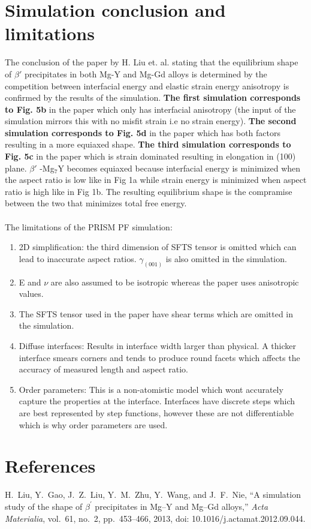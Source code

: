 \documentclass[11pt]{article}
\newcommand{\bprime} {$\beta'$ }
\begin{document}
\section*{Simulation conclusion and limitations}
The conclusion of the paper by H. Liu et. al. stating that the 
equilibrium shape of \bprime precipitates in both Mg-Y and Mg-Gd 
alloys is determined by the competition between interfacial energy 
and elastic strain energy anisotropy is confirmed by the results of the simulation. 
\textbf{The first simulation corresponds to Fig. 5b} in the paper which only has interfacial anisotropy (the input of the simulation mirrors this with no misfit strain i.e no strain energy).
\textbf{The second simulation corresponds to Fig. 5d} in the paper which has both factors resulting in a more equiaxed shape.
\textbf{The third simulation corresponds to Fig. 5c} in the paper which is strain dominated resulting in elongation in (100) plane.
\bprime-Mg$_7$Y becomes equiaxed because interfacial energy is minimized when the aspect ratio is low like in Fig 1a while strain energy is minimized when aspect ratio is high like in Fig 1b.
The resulting equilibrium shape is the compramise between the two that minimizes total free energy.
\\~\\
The limitations of the PRISM PF simulation:
\begin{enumerate}
    \item 2D simplification: the third dimension of SFTS tensor is omitted which can lead to inaccurate aspect ratios. $\gamma_{(001)}$ is also omitted in the simulation.
    \item E and $\nu$ are also assumed to be isotropic whereas the paper uses anisotropic values.
    \item The SFTS tensor used in the paper have shear terms which are omitted in the simulation.
    \item Diffuse interfaces: Results in interface width larger than physical. A thicker interface smears corners and tends to produce round facets
    which affects the accuracy of measured length and aspect ratio.
    \item Order parameters: This is a non-atomistic model which wont accurately capture the properties at the interface. Interfaces have discrete steps which are best represented by step functions, however these are not differentiable which is why order parameters are used.
\end{enumerate}
\newpage
\section*{References}
\noindent [1] H.~Liu, Y.~Gao, J.~Z.~Liu, Y.~M.~Zhu, Y.~Wang, and J.~F.~Nie,
``A simulation study of the shape of $\beta^\prime$ precipitates in Mg--Y and
Mg--Gd alloys,'' \emph{Acta Materialia}, vol.~61, no.~2, pp.~453--466, 2013,
doi: 10.1016/j.actamat.2012.09.044.
\end{document}
